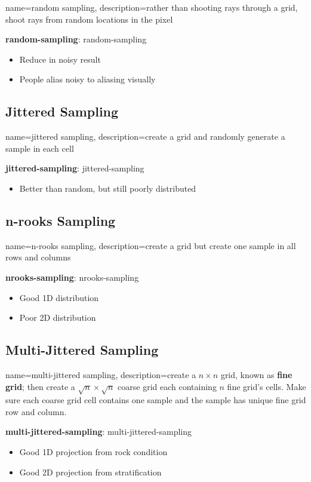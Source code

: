     {
      name=random sampling,
      description={rather than shooting rays through a grid, shoot rays from
      random locations in the pixel}
    }

    \textbf{\Gls{random-sampling}}: \glsdesc{random-sampling}

    \begin{itemize}
      \item Reduce in noisy result
      \item People alias noisy to aliasing visually
    \end{itemize}

  \subsection{Jittered Sampling}

    {
      name=jittered sampling,
      description={create a grid and randomly generate a sample in each cell}
    }

    \textbf{\Gls{jittered-sampling}}: \glsdesc{jittered-sampling}

    \begin{itemize}
      \item Better than random, but still poorly distributed
    \end{itemize}

  \subsection{n-rooks Sampling}

    {
      name=n-rooks sampling,
      description={create a grid but create one sample in all rows and columns}
    }

    \textbf{\Gls{nrooks-sampling}}: \glsdesc{nrooks-sampling}

    \begin{itemize}
      \item Good 1D distribution
      \item Poor 2D distribution
    \end{itemize}

  \subsection{Multi-Jittered Sampling}

    {
      name=multi-jittered sampling,
      description={create a $ n \times n $ grid, known as \textbf{fine grid};
      then create a $ \sqrt{n} \times \sqrt{n} $ coarse grid each
      containing $ n $ fine grid's cells.
      Make sure each coarse grid cell contains one sample
      and the sample has unique fine grid row and column.}
    }

    \textbf{\Gls{multi-jittered-sampling}}: \glsdesc{multi-jittered-sampling}

    \begin{itemize}
      \item Good 1D projection from rock condition
      \item Good 2D projection from stratification
    \end{itemize}
